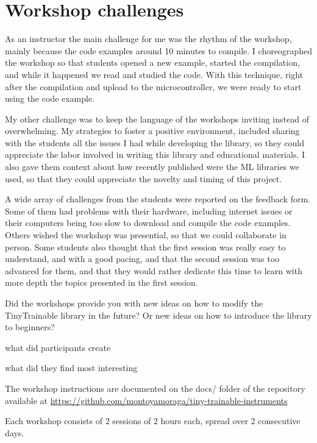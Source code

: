 \section{Workshop challenges}

As an instructor the main challenge for me was the rhythm of the workshop, mainly because the code examples around 10 minutes to compile. I choreographed the workshop so that students opened a new example, started the compilation, and while it happened we read and studied the code. With this technique, right after the compilation and upload to the microcontroller, we were ready to start using the code example.

My other challenge was to keep the language of the workshops inviting instead of overwhelming. My strategies to foster a positive environment, included sharing  with the students all the issues I had while developing the library, so they could appreciate the labor involved in writing this library and educational materials. I also gave them context about how recently published were the \acrshort{ML} libraries we used, so that they could appreciate the novelty and timing of this project.

A wide array of challenges from the students were reported on the feedback form. Some of them had problems with their hardware, including internet issues or their computers being too slow to download and compile the code examples. Others wished the workshop was presential, so that we could collaborate in person. Some students also thought that the first session was really easy to understand, and with a good pacing, and that the second session was too advanced for them, and that they would rather dedicate this time to learn with more depth the topics presented in the first session.

Did the workshops provide you with new ideas on how to modify the TinyTrainable library in the future? Or new ideas on how to introduce the library to beginners?

what did participants create


what did they find most interesting



The workshop instructions are documented on the docs/ folder of the repository available at \url{https://github.com/montoyamoraga/tiny-trainable-instruments}

Each workshop consists of 2 sessions of 2 hours each, spread over 2 consecutive days.
